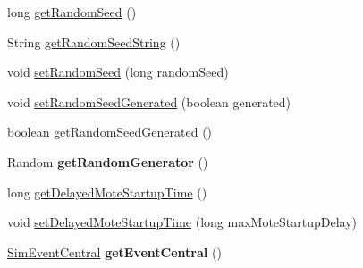\begin{DoxyCompactItemize}
\item 
long \hyperlink{classorg_1_1contikios_1_1cooja_1_1Simulation_a310a51eb19707a9e847fec4b4b775926}{get\-Random\-Seed} ()
\item 
String \hyperlink{classorg_1_1contikios_1_1cooja_1_1Simulation_ace807bab2595c0bd0ca0340fdcc18f00}{get\-Random\-Seed\-String} ()
\item 
void \hyperlink{classorg_1_1contikios_1_1cooja_1_1Simulation_a722faaa06409286d004d9c27d9aa0bbc}{set\-Random\-Seed} (long random\-Seed)
\item 
void \hyperlink{classorg_1_1contikios_1_1cooja_1_1Simulation_a7397ff8b8cbd59f74f55f6675f878771}{set\-Random\-Seed\-Generated} (boolean generated)
\item 
boolean \hyperlink{classorg_1_1contikios_1_1cooja_1_1Simulation_acfed81b0086075e65c7bf0460d87aec2}{get\-Random\-Seed\-Generated} ()
\item 
\hypertarget{classorg_1_1contikios_1_1cooja_1_1Simulation_a9caa40fd1262afa7cabff6ea7d2a8e31}{Random {\bfseries get\-Random\-Generator} ()}\label{classorg_1_1contikios_1_1cooja_1_1Simulation_a9caa40fd1262afa7cabff6ea7d2a8e31}

\item 
long \hyperlink{classorg_1_1contikios_1_1cooja_1_1Simulation_a5d353adf641e2d4934c69401c9fed8c4}{get\-Delayed\-Mote\-Startup\-Time} ()
\item 
void \hyperlink{classorg_1_1contikios_1_1cooja_1_1Simulation_a04fda7fc1c736d53bd56590a692cc3fa}{set\-Delayed\-Mote\-Startup\-Time} (long max\-Mote\-Startup\-Delay)
\item 
\hypertarget{classorg_1_1contikios_1_1cooja_1_1Simulation_a308e19b3d0767003875ea1b4f66a796e}{\hyperlink{classorg_1_1contikios_1_1cooja_1_1SimEventCentral}{Sim\-Event\-Central} {\bfseries get\-Event\-Central} ()}\label{classorg_1_1contikios_1_1cooja_1_1Simulation_a308e19b3d0767003875ea1b4f66a796e}


\end{DoxyCompactItemize}
